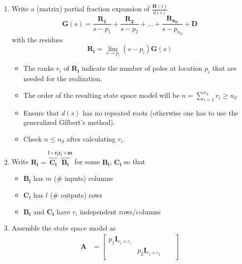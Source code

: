 \newpar{}
\begin{enumerate}
    \item Write a (matrix) partial fraction expansion of $\frac{\mathbf{H}(s)}{d(s)}$
          \begin{equation*}
              \mathbf{G}(s)=\frac{\mathbf{R_1}}{s-p_1}+\frac{\mathbf{R_2}}{s-p_2}+\ldots+\frac{\mathbf{R_{n_d}}}{s-p_{n_d}}+\mathbf{D}
          \end{equation*} with the residues
          \begin{equation*}
              \mathbf{R_i}=\lim_{s\to p_i}(s-p_i)\mathbf{G}(s)
          \end{equation*}
          \begin{itemize}
              \item The ranks $r_i$ of $\mathbf{R_i}$ indicate the number of poles at location $p_i$ that are needed for the realization.
              \item The order of the resulting state space model will be $n=\sum_{i=1}^{n_d}r_i\geq n_d$
              \item Ensure that $d(s)$ has no repeated roots (otherwise one has to use the generalized Gilbert's method).
              \item Check $n\le n_d$ after calculating $r_i$.
          \end{itemize}
    \item Write $\mathbf{R_i}=\mathbf{\overbrace{\mathbf{C}_i}^{l\times r_i}\overbrace{ \mathbf{B}_i}^{r_i \times m}}$ for some $\mathbf{B_i}$, $\mathbf{C_i}$ so that
          \begin{itemize}
              \item $\mathbf{B_i}$ has $m$ (\# inputs) columns
              \item $\mathbf{C_i}$ has $l$ (\# outputs) rows
              \item $\mathbf{B_i}$ and $\mathbf{C_i}$ have $r_i$ independent rows/columns
          \end{itemize}
    \item Assemble the state space model as
          \begin{align*}
              \mathbf{A} & =\begin{bmatrix}
                                p_1 \mathbf{I}_{r_1\times r_1} &                                &        &                                            \\
                                                               & p_2 \mathbf{I}_{r_2\times r_2} &        &                                            \\

\end{bmatrix}
\end{align*}
\end{enumerate}
